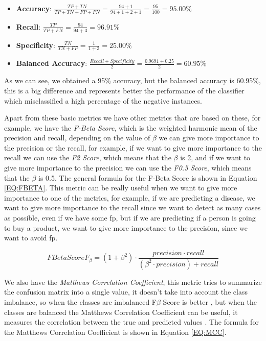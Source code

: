 \begin{itemize}
    \item \textbf{Accuracy}: $ \frac{TP + TN}{TP + TN + FP + FN} = \frac{94 + 1}{94+1+2+1} = \frac{95}{100} = 95.00\%$
    \item \textbf{Recall}: $\frac{TP}{TP + FN}=\frac{94}{94+3} = 96.91\%$
    \item \textbf{Specificity}: $\frac{TN}{TN + FP}=\frac{1}{1+3} = 25.00\%$
    \item \textbf{Balanced Accuracy}: $\frac{Recall + Specificity}{2}=\frac{0.9691 + 0.25}{2} = 60.95\%$
\end{itemize}

As we can see, we obtained a 95\% accuracy, but the balanced accuracy is 60.95\%, this is a big difference and represents better the performance of the classifier which misclassified a high percentage of the negative instances.

Apart from these basic metrics we have other metrics that are based on these, for example, we have the \textit{F-Beta Score}, which is the weighted harmonic mean of the precision and recall, depending on the value of $\beta$ we can give more importance to the precision or the recall, for example, if we want to give more importance to the recall we can use the \textit{F2 Score}, which means that the $\beta$ is 2, and if we want to give more importance to the precision we can use the \textit{F0.5 Score}, which means that the $\beta$ is 0.5. The general formula for the F-Beta Score is shown in Equation \ref{EQ:FBETA}. This metric can be really useful when we want to give more importance to one of the metrics, for example, if we are predicting a disease, we want to give more importance to the recall since we want to detect as many cases as possible, even if we have some \ac{fp}, but if we are predicting if a person is going to buy a product, we want to give more importance to the precision, since we want to avoid \ac{fp}.

\begin{equation}[EQ:FBETA]{F Beta Score}
    \boxed{F_{\beta} = (1+\beta^2)\cdot\frac{precision \cdot recall}{(\beta^2\cdot precision)+recall}}
\end{equation}

We also have the \textit{Matthews Correlation Coefficient}, this metric tries to summarize the confusion matrix into a single value, it doesn't take into account the class imbalance, so when the classes are imbalanced F$\beta$ Score is better \cite{sisters_matthews_2020}, but when the classes are balanced the Matthews Correlation Coefficient can be useful, it measures the correlation between the true and predicted values \cite{shmueli_matthews_2020}. The formula for the Matthews Correlation Coefficient is shown in Equation \ref{EQ:MCC}.

